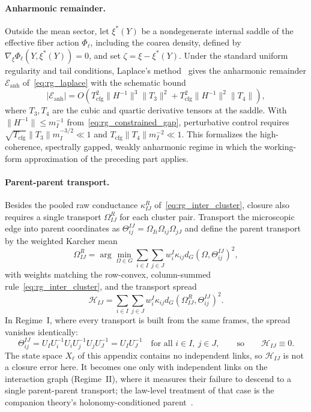 \paragraph{Anharmonic remainder.}
Outside the mean sector, let $\xi^*(Y)$ be a nondegenerate internal saddle of the effective fiber action $\Phi_\ell$, including the coarea density, defined by $\nabla_\xi\Phi_\ell(Y,\xi^*(Y))=0$, and set $\zeta=\xi-\xi^*(Y)$. Under the standard uniform regularity and tail conditions, Laplace's method~\cite{wong2001asymptotic} gives the anharmonic remainder $\mathcal{E}_{\mathrm{anh}}$ of~\eqref{eq:rg_laplace} with the schematic bound
\begin{equation}
|\mathcal{E}_{\mathrm{anh}}|
=O\left(T_{\mathrm{cfg}}^2\|H^{-1}\|^3\|T_3\|^2+T_{\mathrm{cfg}}^2\|H^{-1}\|^2\|T_4\|\right),
\end{equation}
where $T_3,T_4$ are the cubic and quartic derivative tensors at the saddle. With $\|H^{-1}\|\leq m_I^{-1}$ from~\eqref{eq:rg_constrained_gap}, perturbative control requires $\sqrt{T_{\mathrm{cfg}}}\|T_3\|m_I^{-3/2}\ll1$ and $T_{\mathrm{cfg}}\|T_4\|m_I^{-2}\ll1$. This formalizes the high-coherence, spectrally gapped, weakly anharmonic regime in which the working-form approximation of the preceding part applies.

\paragraph{Parent-parent transport.}
Besides the pooled raw conductance $\kappa_{IJ}^R$ of~\eqref{eq:rg_inter_cluster}, closure also requires a single transport $\Omega_{IJ}^R$ for each cluster pair. Transport the microscopic edge into parent coordinates as $\Theta_{ij}^{IJ} = \Omega_{Ii}\Omega_{ij}\Omega_{jJ}$ and define the parent transport by the weighted Karcher mean
\begin{equation}
\Omega_{IJ}^R = \arg\min_{\Omega \in G} \sum_{i \in I}\sum_{j \in J} w_i^I \kappa_{ij} d_G(\Omega, \Theta_{ij}^{IJ})^2,
\end{equation}
with weights matching the row-convex, column-summed rule~\eqref{eq:rg_inter_cluster}, and the transport spread
\begin{equation}
\mathcal{H}_{IJ} = \sum_{i \in I}\sum_{j \in J} w_i^I \kappa_{ij} d_G(\Omega_{IJ}^R, \Theta_{ij}^{IJ})^2 .
\end{equation}
In Regime~I, where every transport is built from the same frames, the spread vanishes identically:
\begin{equation}
\Theta_{ij}^{IJ}=U_IU_i^{-1}U_iU_j^{-1}U_jU_J^{-1}=U_IU_J^{-1}\quad\text{for all } i\in I,\ j\in J,
\qquad\text{so}\qquad \mathcal{H}_{IJ}\equiv0 .
\label{eq:rg_holonomy_trivial}
\end{equation}
The state space $X_\ell$ of this appendix contains no independent links, so $\mathcal{H}_{IJ}$ is not a closure error here. It becomes one only with independent links on the interaction graph (Regime~II), where it measures their failure to descend to a single parent-parent transport; the law-level treatment of that case is the companion theory's holonomy-conditioned parent~\cite[Ch.~10]{DennisGaugeVFE2026}.

